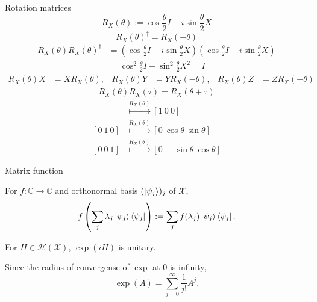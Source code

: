 \documentclass{beamer}
\begin{document}
\begin{frame}{Rotation matrices}
\begin{equation*}
R_X(\theta) := \cos\frac{\theta}2 I - i \sin\frac{\theta}2 X
\end{equation*}
\begin{equation*}
R_X(\theta)^\dagger = R_X(-\theta)
\end{equation*}
\begin{align*}
R_X(\theta)R_X(\theta)^\dagger &= (\cos\frac{\theta}2 I - i \sin\frac{\theta}2 X)(\cos\frac{\theta}2 I + i \sin\frac{\theta}2 X)\\
&= \cos^2\frac{\theta}2 I + \sin^2\frac{\theta}2 X^2=I
\end{align*}
\begin{align*}
R_X(\theta)X&=X R_X(\theta),&
R_X(\theta)Y&=Y R_X(-\theta),&
R_X(\theta)Z&=Z R_X(-\theta)
\end{align*}
\begin{align*}
R_X(\theta)R_X(\tau)=R_X(\theta+\tau)
\end{align*}
\begin{align*}
[1\  0\  0]&\overset{R_X(\theta)}{\longmapsto} [1\ 0\ 0]\\
[0\  1\  0]&\overset{R_X(\theta)}{\longmapsto} [0\ \cos\theta\ \sin\theta]\\
[0\  0\  1]&\overset{R_X(\theta)}{\longmapsto} [0\ -\sin\theta\ \cos\theta]
\end{align*}
\end{frame}

\begin{frame}{Matrix function}
\begin{definition}
For $f\colon \mathbb{C}\to\mathbb{C}$ and orthonormal basis $(\ket{\psi_j})_j$ of $\mathcal{X}$,
\begin{equation*}
f\left(\sum_j \lambda_j \ket{\psi_j}\bra{\psi_j}\right) := \sum_j f(\lambda_j) \ket{\psi_j}\bra{\psi_j}.
\end{equation*}
\end{definition}
For $H\in\mathcal{H}(\mathcal{X})$,
$\exp(iH)$ is unitary.

\vspace{2em}
Since the radius of convergense of $\exp$ at 0 is infinity,
\begin{equation*}
\exp(A) = \sum_{j=0}^\infty \frac1{j!}A^j.
\end{equation*}
\end{frame}
\end{document}
